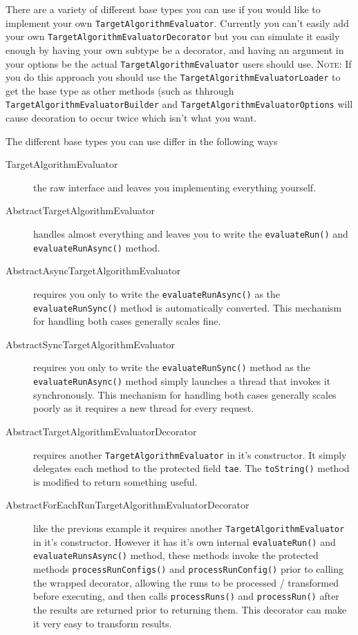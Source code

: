 \documentclass[11pt,letterpaper,oneside]{article}
\begin{document}
There are a variety of different base types you can use if you would like to implement your own \texttt{TargetAlgorithmEvaluator}. Currently you can't easily add your own \texttt{TargetAlgorithmEvaluatorDecorator} but you can simulate it easily enough by having your own subtype be a decorator, and having an argument in your options be the actual \texttt{TargetAlgorithmEvaluator} users should use. \textsc{Note:} If you do this approach you should use the \texttt{TargetAlgorithmEvaluatorLoader} to get the base type as other methods (such as thhrough \texttt{TargetAlgorithmEvaluatorBuilder} and \texttt{TargetAlgorithmEvaluatorOptions} will cause decoration to occur twice which isn't what you want.

The different base types you can use differ in the following ways

\begin{description}

\item[TargetAlgorithmEvaluator] the raw interface and leaves you implementing everything yourself.

\item[AbstractTargetAlgorithmEvaluator] handles almost everything and leaves you to write the \texttt{evaluateRun()} and \texttt{evaluateRunAsync()} method.

\item[AbstractAsyncTargetAlgorithmEvaluator] requires you only to write the \texttt{evaluateRunAsync()} as the \texttt{evaluateRunSync()} method is automatically converted. This mechanism for handling both cases generally scales fine.

\item[AbstractSyncTargetAlgorithmEvaluator] requires you only to write the \texttt{evaluateRunSync()} method as the \texttt{evaluateRunAsync()} method simply launches a thread that invokes it synchronously. This mechanism for handling both cases generally scales poorly as it requires a new thread for every request.

\item[AbstractTargetAlgorithmEvaluatorDecorator] requires another \texttt{TargetAlgorithmEvaluator} in it's constructor. It simply delegates each method to the protected field \texttt{tae}. The \texttt{toString()} method is modified to return something useful.

\item[AbstractForEachRunTargetAlgorithmEvaluatorDecorator] like the previous example it requires another \texttt{TargetAlgorithmEvaluator} in it's constructor. However it has it's own internal \texttt{evaluateRun()} and \texttt{evaluateRunsAsync()} method, these methods invoke the protected methods \texttt{processRunConfigs()} and \texttt{processRunConfig()} prior to calling the wrapped decorator, allowing the runs to be processed / transformed before executing,
and then calls \texttt{processRuns()} and \texttt{processRun()} after the results are returned prior to returning them. This decorator can make it very easy to transform results.
\end{description}
\end{document}

